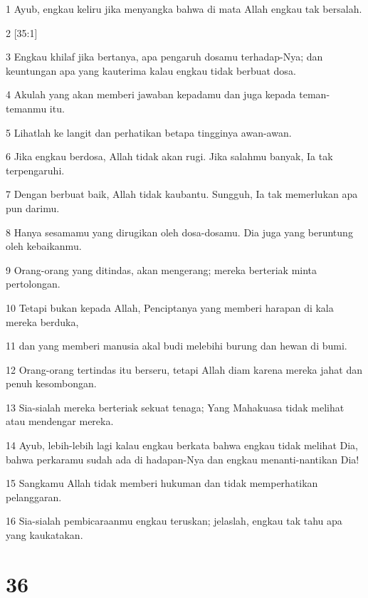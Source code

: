 \par 1 Ayub, engkau keliru jika menyangka bahwa di mata Allah engkau tak bersalah.
\par 2 [35:1]
\par 3 Engkau khilaf jika bertanya, apa pengaruh dosamu terhadap-Nya; dan keuntungan apa yang kauterima kalau engkau tidak berbuat dosa.
\par 4 Akulah yang akan memberi jawaban kepadamu dan juga kepada teman-temanmu itu.
\par 5 Lihatlah ke langit dan perhatikan betapa tingginya awan-awan.
\par 6 Jika engkau berdosa, Allah tidak akan rugi. Jika salahmu banyak, Ia tak terpengaruhi.
\par 7 Dengan berbuat baik, Allah tidak kaubantu. Sungguh, Ia tak memerlukan apa pun darimu.
\par 8 Hanya sesamamu yang dirugikan oleh dosa-dosamu. Dia juga yang beruntung oleh kebaikanmu.
\par 9 Orang-orang yang ditindas, akan mengerang; mereka berteriak minta pertolongan.
\par 10 Tetapi bukan kepada Allah, Penciptanya yang memberi harapan di kala mereka berduka,
\par 11 dan yang memberi manusia akal budi melebihi burung dan hewan di bumi.
\par 12 Orang-orang tertindas itu berseru, tetapi Allah diam karena mereka jahat dan penuh kesombongan.
\par 13 Sia-sialah mereka berteriak sekuat tenaga; Yang Mahakuasa tidak melihat atau mendengar mereka.
\par 14 Ayub, lebih-lebih lagi kalau engkau berkata bahwa engkau tidak melihat Dia, bahwa perkaramu sudah ada di hadapan-Nya dan engkau menanti-nantikan Dia!
\par 15 Sangkamu Allah tidak memberi hukuman dan tidak memperhatikan pelanggaran.
\par 16 Sia-sialah pembicaraanmu engkau teruskan; jelaslah, engkau tak tahu apa yang kaukatakan.

\chapter{36}

